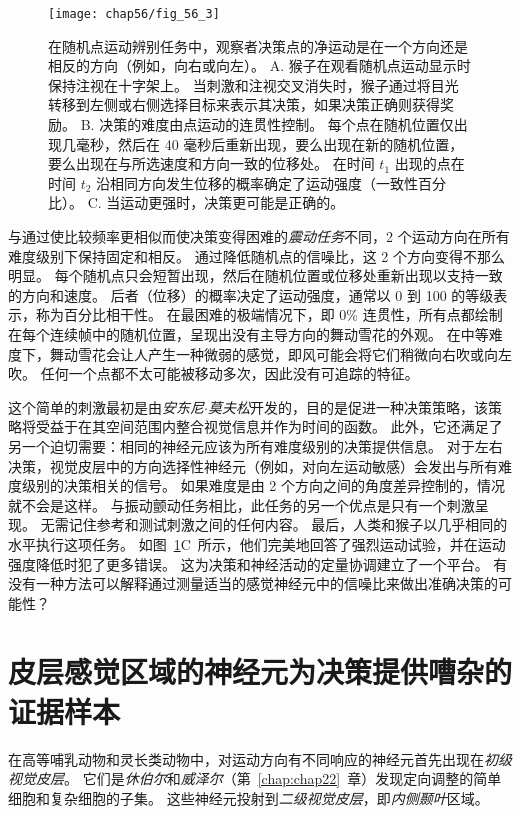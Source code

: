 \begin{figure}[htbp]
	\centering
	\texttt{[image: chap56/fig\_56\_3]}
	\caption{在随机点运动辨别任务中，观察者决策点的净运动是在一个方向还是相反的方向（例如，向右或向左）。
		A. 猴子在观看随机点运动显示时保持注视在十字架上。
		当刺激和注视交叉消失时，猴子通过将目光转移到左侧或右侧选择目标来表示其决策，如果决策正确则获得奖励。
		B. 决策的难度由点运动的连贯性控制。
		每个点在随机位置仅出现几毫秒，然后在 40 毫秒后重新出现，要么出现在新的随机位置，要么出现在与所选速度和方向一致的位移处。
		在时间 $t_1$ 出现的点在时间 $t_2$ 沿相同方向发生位移的概率确定了运动强度（一致性百分比）\cite{britten1992analysis}。
		C. 当运动更强时，决策更可能是正确的。}
	\label{fig:56_3}
\end{figure}


与通过使比较频率更相似而使决策变得困难的\textit{震动任务}不同，2 个运动方向在所有难度级别下保持固定和相反。
通过降低随机点的信噪比，这 2 个方向变得不那么明显。
每个随机点只会短暂出现，然后在随机位置或位移处重新出现以支持一致的方向和速度。
后者（位移）的概率决定了运动强度，通常以 0 到 100 的等级表示，称为百分比相干性。
在最困难的极端情况下，即 0\% 连贯性，所有点都绘制在每个连续帧中的随机位置，呈现出没有主导方向的舞动雪花的外观。
在中等难度下，舞动雪花会让人产生一种微弱的感觉，即风可能会将它们稍微向右吹或向左吹。
任何一个点都不太可能被移动多次，因此没有可追踪的特征。


这个简单的刺激最初是由\textit{安东尼$\cdot$莫夫松}开发的，目的是促进一种决策策略，该策略将受益于在其空间范围内整合视觉信息并作为时间的函数。
此外，它还满足了另一个迫切需要：相同的神经元应该为所有难度级别的决策提供信息。
对于左右决策，视觉皮层中的方向选择性神经元（例如，对向左运动敏感）会发出与所有难度级别的决策相关的信号。
如果难度是由 2 个方向之间的角度差异控制的，情况就不会是这样。
与振动颤动任务相比，此任务的另一个优点是只有一个刺激呈现。
无需记住参考和测试刺激之间的任何内容。
最后，人类和猴子以几乎相同的水平执行这项任务。
如图~\ref{fig:56_3}C~所示，他们完美地回答了强烈运动试验，并在运动强度降低时犯了更多错误。
这为决策和神经活动的定量协调建立了一个平台。
有没有一种方法可以解释通过测量适当的感觉神经元中的信噪比来做出准确决策的可能性？



\section{皮层感觉区域的神经元为决策提供嘈杂的证据样本}

在高等哺乳动物和灵长类动物中，对运动方向有不同响应的神经元首先出现在\textit{初级视觉皮层}。
它们是\textit{休伯尔}和\textit{威泽尔}（第~\ref{chap:chap22}~章）发现定向调整的简单细胞和复杂细胞的子集。
这些神经元投射到\textit{二级视觉皮层}，即\textit{内侧颞叶}区域。


